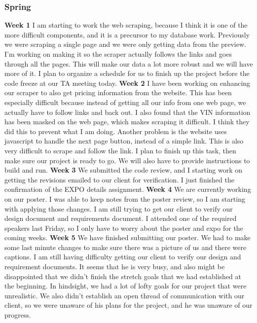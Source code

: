 \documentclass[onecolumn, draftclsnofoot, 10pt, compsoc]{IEEEtran}
\begin{document}
\subsubsection{Spring}

\textbf{Week 1}
I am starting to work the web scraping, because I think it is one of the more difficult components, and it is a precursor to my database work. Previously we were scraping a single page and we were only getting data from the preview. I'm working on making it so the scraper actually follows the links and goes through all the pages. This will make our data a lot more robust and we will have more of it. 
I plan to organize a schedule for us to finish up the project before the code freeze at our TA meeting today. 
\newline
\textbf{Week 2}
I have been working on enhancing our scraper to also get pricing information from the website. This has been especially difficult because instead of getting all our info from one web page, we actually have to follow links and back out. I also found that the VIN information has been masked on the web page, which makes scraping it difficult. I think they did this to prevent what I am doing. Another problem is the website uses javascript to handle the next page button, instead of a simple link. This is also very difficult to scrape and follow the link. 
I plan to finish up this task, then make sure our project is ready to go. We will also have to provide instructions to build and run. 
\newline
\textbf{Week 3}
We submitted the code review, and I starting work on getting the revisions emailed to our client for verification. 
I just finished the confirmation of the EXPO details assignment. 
\newline
\textbf{Week 4}
We are currently working on our poster. I was able to keep notes from the poster review, so I am starting with applying those changes. I am still trying to get our client to verify our design document and requirements document. 
I attended one of the required speakers last Friday, so I only have to worry about the poster and expo for the coming weeks. 
\newline
\textbf{Week 5}
We have finished submitting our poster. We had to make some last minute changes to make sure there was a picture of us and there were captions. 
I am still having difficulty getting our client to verify our design and requirement documents. It seems that he is very busy, and also might be disappointed that we didn't finish the stretch goals that we had established at the beginning. In hindsight, we had a lot of lofty goals for our project that were unrealistic. We also didn't establish an open thread of communication with our client, so we were unaware of his plans for the project, and he was unaware of our progress. 
\end{document}
